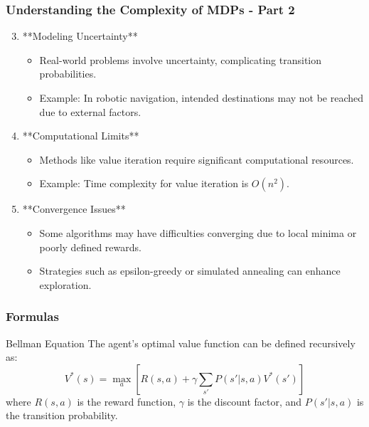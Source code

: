 \documentclass[aspectratio=169]{beamer}
\begin{document}
\begin{frame}[fragile]
    \frametitle{Understanding the Complexity of MDPs - Part 2}
    \begin{enumerate}
        \setcounter{enumi}{2}
        \item **Modeling Uncertainty**
        \begin{itemize}
            \item Real-world problems involve uncertainty, complicating transition probabilities.
            \item Example: In robotic navigation, intended destinations may not be reached due to external factors.
        \end{itemize}

        \item **Computational Limits**
        \begin{itemize}
            \item Methods like value iteration require significant computational resources.
            \item Example: Time complexity for value iteration is \( O(n^2) \).
        \end{itemize}
        
        \item **Convergence Issues**
        \begin{itemize}
            \item Some algorithms may have difficulties converging due to local minima or poorly defined rewards.
            \item Strategies such as epsilon-greedy or simulated annealing can enhance exploration.
        \end{itemize}
    \end{enumerate}
\end{frame}

\begin{frame}[fragile]
    \frametitle{Formulas}
    \begin{block}{Bellman Equation}
        The agent's optimal value function can be defined recursively as:
        \begin{equation}
            V^*(s) = \max_a \left[ R(s, a) + \gamma \sum_{s'} P(s' | s, a)V^*(s') \right]
        \end{equation}
        where \( R(s, a) \) is the reward function, \( \gamma \) is the discount factor, and \( P(s' | s, a) \) is the transition probability.
    \end{block}
\end{frame}
\end{document}
